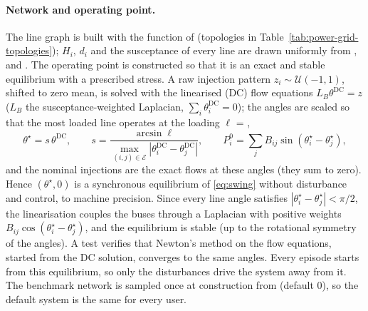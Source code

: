 \paragraph{Network and operating point.} The line graph is built with the
function  of  (topologies in
Table~\ref{tab:power-grid-topologies}); $H_i$, $d_i$ and the susceptance of every
line are drawn uniformly from ,  and
. The operating point is constructed so that it is an
exact and stable equilibrium with a prescribed stress. A raw injection pattern
$z_i \sim \mathcal{U}(-1, 1)$, shifted to zero mean, is solved with the
linearised (DC) flow equations $L_B \theta^{\mathrm{DC}} = z$ ($L_B$ the
susceptance-weighted Laplacian, $\sum_i \theta^{\mathrm{DC}}_i = 0$); the angles
are scaled so that the most loaded line operates at the loading
$\ell$ = ,
\begin{equation}
  \theta^\star = s\,\theta^{\mathrm{DC}}, \qquad
  s = \frac{\arcsin \ell}{\max_{(i,j) \in \mathcal{E}} |\theta^{\mathrm{DC}}_i - \theta^{\mathrm{DC}}_j|},
  \qquad
  P_i^0 = \sum_j B_{ij} \sin(\theta^\star_i - \theta^\star_j),
  \label{eq:power-grid-operating-point}
\end{equation}
and the nominal injections are the exact flows at these angles (they sum to
zero). Hence $(\theta^\star, 0)$ is a synchronous equilibrium of
\eqref{eq:swing} without disturbance and control, to machine precision. Since
every line angle satisfies $|\theta^\star_i - \theta^\star_j| < \pi/2$, the
linearisation couples the buses through a Laplacian with positive weights
$B_{ij}\cos(\theta^\star_i - \theta^\star_j)$, and the equilibrium is stable
(up to the rotational symmetry of the angles). A test verifies that Newton's
method on the flow equations, started from the DC solution, converges to the
same angles. Every episode starts from this equilibrium, so only the
disturbances drive the system away from it. The benchmark network is sampled
once at construction from  (default 0), so the default system
is the same for every user.

